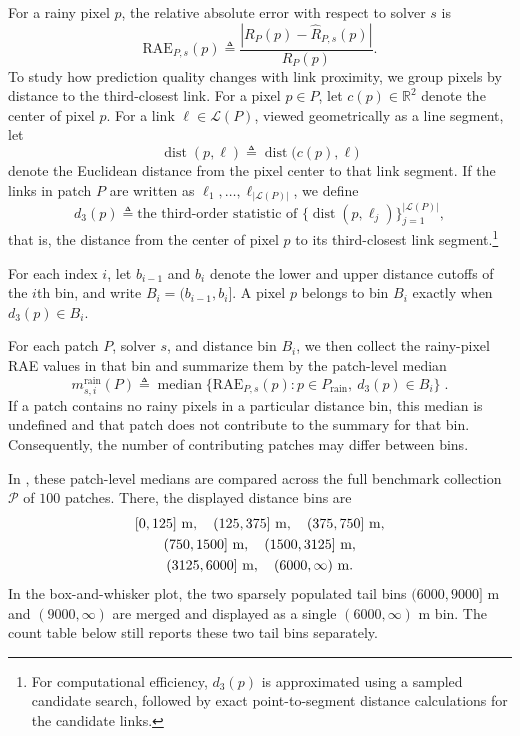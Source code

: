 \documentclass[11pt]{article}
\begin{document}
For a rainy pixel $p$, the relative absolute error with respect to solver $s$ is
\[
\mathrm{RAE}_{P,s}(p)\triangleq\frac{|R_P(p)-\widehat{R}_{P,s}(p)|}{R_P(p)}.
\]
To study how prediction quality changes with link proximity, we group pixels by distance to the third-closest link. For a pixel $p\in P$, let $c(p)\in\mathbb{R}^2$ denote the center of pixel $p$. For a link $\ell\in\mathcal{L}(P)$, viewed geometrically as a line segment, let
\[
\operatorname{dist}(p,\ell)\triangleq \operatorname{dist}\bigl(c(p),\ell\bigr)
\]
denote the Euclidean distance from the pixel center to that link segment. If the links in patch $P$ are written as $\ell_1,\dots,\ell_{|\mathcal{L}(P)|}$, we define
\[
d_3(p)\triangleq \text{the third-order statistic of } \bigl\{\operatorname{dist}(p,\ell_j)\bigr\}_{j=1}^{|\mathcal{L}(P)|},
\]
that is, the distance from the center of pixel $p$ to its third-closest link segment.\footnote{\color{black}For computational efficiency, $d_3(p)$ is approximated using a sampled candidate search, followed by exact point-to-segment distance calculations for the candidate links.}

For each index $i$, let $b_{i-1}$ and $b_i$ denote the lower and upper distance cutoffs of the $i$th bin, and write $B_i=(b_{i-1},b_i]$. A pixel $p$ belongs to bin $B_i$ exactly when $d_3(p)\in B_i$.

For each patch $P$, solver $s$, and distance bin $B_i$, we then collect the rainy-pixel RAE values in that bin and summarize them by the patch-level median
\[
m_{s,i}^{\mathrm{rain}}(P)\triangleq
\operatorname{median}\bigl\{\mathrm{RAE}_{P,s}(p): p\in 
P_{\mathrm{rain}},\ d_3(p)\in B_i
\bigr\}\;.
\]
{\color{black}If a patch contains no rainy pixels in a particular distance bin, this median is undefined and that patch does not contribute to the summary for that bin. Consequently, the number of contributing patches may differ between bins.}

In , these patch-level medians are compared across the full benchmark collection $\mathcal{P}$ of $100$ patches. There, the displayed distance bins are
\[
\begin{gathered}
\relax [0,125]\ \text{m},\quad (125,375]\ \text{m},\quad (375,750]\ \text{m},\\
(750,1500]\ \text{m},\quad (1500,3125]\ \text{m},\\
(3125,6000]\ \text{m},\quad (6000,\infty)\ \text{m}.
\end{gathered}
\]
In the box-and-whisker plot, the two sparsely populated tail bins $(6000,9000]$ m and $(9000,\infty)$ are merged and displayed as a single $(6000,\infty)$ m bin. The count table below still reports these two tail bins separately.
\end{document}
